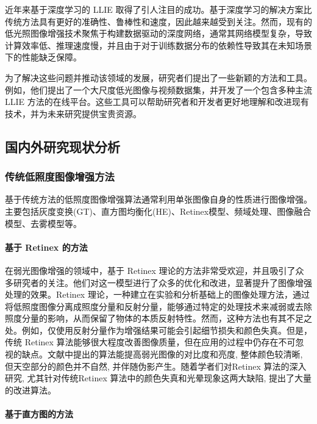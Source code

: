 \documentclass[a4paper]{ctexart}
\begin{document}
	近年来基于深度学习的 LLIE 取得了引人注目的成功。基于深度学习的解决方案比传统方法具有更好的准确性、鲁棒性和速度，因此越来越受到关注。然而，现有的低光照图像增强技术聚焦于构建数据驱动的深度网络，通常其网络模型复杂，导致计算效率低、推理速度慢，并且由于对于训练数据分布的依赖性导致其在未知场景下的性能缺乏保障。
	
	为了解决这些问题并推动该领域的发展，研究者们提出了一些新颖的方法和工具。例如，他们提出了一个大尺度低光图像与视频数据集，并开发了一个包含多种主流 LLIE 方法的在线平台。这些工具可以帮助研究者和开发者更好地理解和改进现有技术，并为未来研究提供宝贵资源。
	
	\subsection{国内外研究现状分析}
	
	\subsubsection{传统低照度图像增强方法}
	基于传统方法的低照度图像增强算法通常利用单张图像自身的性质进行图像增强。主要包括灰度变换(GT)\textcolor{blue}{\cite{ueng1995gamma}}、直方图均衡化(HE)\textcolor{blue}{\cite{stark2000adaptive}}、Retinex模型\textcolor{blue}{\cite{land1971lightness}}、频域处理\textcolor{blue}{\cite{liu2021benchmarking}}、图像融合模型\textcolor{blue}{\cite{dai2019fractional}}、去雾模型\textcolor{blue}{\cite{ma2019improved}}等。
	
	\paragraph{基于 Retinex 的方法}
	
	在弱光图像增强的领域中，基于 Retinex 理论的方法非常受欢迎，并且吸引了众多研究者的关注。他们对这一模型进行了众多的优化和改进，显著提升了图像增强处理的效果。Retinex 理论，一种建立在实验和分析基础上的图像处理方法，通过将低照度图像分离成照度分量和反射分量，能够通过特定的处理技术来减弱或去除照度分量的影响，从而保留了物体的本质反射特性。然而，这种方法也有其不足之处。例如，仅使用反射分量作为增强结果可能会引起细节损失和颜色失真。但是，传统 Retinex 算法能够很大程度改善图像质量，但在应用的过程中仍存在不可忽视的缺点。文献\cite{cooper2004analysis}中提出的算法能提高弱光图像的对比度和亮度, 整体颜色较清晰, 但天空部分的颜色并不自然, 并伴随伪影产生。随着学者们对Retinex 算法的深入研究, 尤其针对传统Retinex 算法中的颜色失真和光晕现象这两大缺陷, 提出了大量的改进算法。
	
	\paragraph{基于直方图的方法}
	
\end{document}

